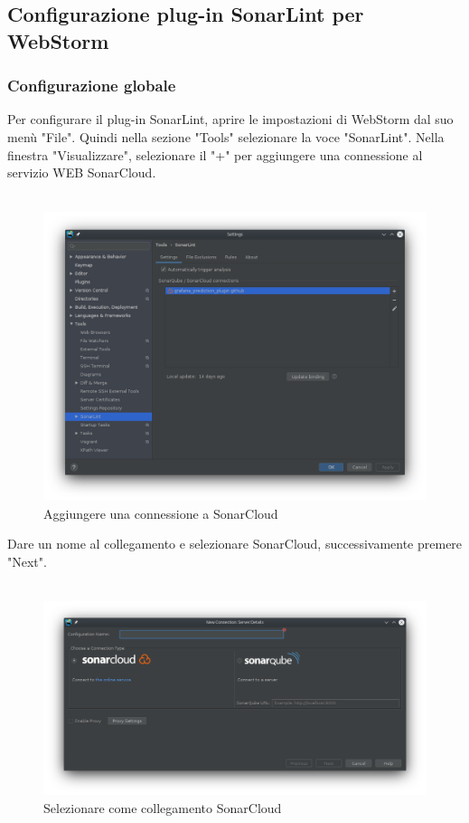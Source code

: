 \pagebreak
\subsection{Configurazione plug-in SonarLint per WebStorm}
\subsubsection{Configurazione globale}
Per configurare il plug-in SonarLint, aprire le impostazioni di WebStorm dal suo menù "File". Quindi nella sezione "Tools" selezionare la voce "SonarLint". Nella finestra "Visualizzare", selezionare il "+" per aggiungere una connessione al servizio WEB SonarCloud.
\\
\\
\begin{figure}[H] 	
	\begin{center}
		\includegraphics[width=\textwidth,height=\textheight,keepaspectratio]{img/connection.png}
	\end{center}
	\caption{Aggiungere una connessione a SonarCloud}	
\end{figure}
\pagebreak
Dare un nome al collegamento e selezionare SonarCloud, successivamente premere "Next".
\\
\\
\begin{figure}[H] 	
	\begin{center}
		\includegraphics[width=\textwidth,height=\textheight,keepaspectratio]{img/connection-name.png}
	\end{center}
	\caption{Selezionare come collegamento SonarCloud}	
\end{figure}
